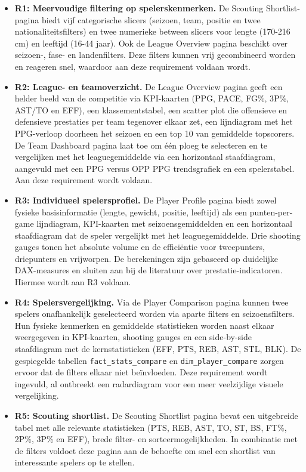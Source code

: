 \begin{itemize}
  \item \textbf{R1: Meervoudige filtering op spelerskenmerken.} De Scouting Shortlist-pagina biedt vijf categorische slicers (seizoen, team, positie en twee nationaliteitsfilters) en twee numerieke between slicers voor lengte (170-216 cm) en leeftijd (16-44 jaar). Ook de League Overview pagina beschikt over seizoen-, fase- en landenfilters. Deze filters kunnen vrij gecombineerd worden en reageren snel, waardoor aan deze requirement voldaan wordt.
 
  \item \textbf{R2: League- en teamoverzicht.} De League Overview pagina geeft een helder beeld van de competitie via KPI-kaarten (PPG, PACE, FG\%, 3P\%, AST/TO en EFF), een klassementstabel, een scatter plot die offensieve en defensieve prestaties per team tegenover elkaar zet, een lijndiagram met het PPG-verloop doorheen het seizoen en een top 10 van gemiddelde topscorers. De Team Dashboard pagina laat toe om één ploeg te selecteren en te vergelijken met het leaguegemiddelde via een horizontaal staafdiagram, aangevuld met een PPG versus OPP PPG trendsgrafiek en een spelerstabel. Aan deze requirement wordt voldaan.
 
  \item \textbf{R3: Individueel spelersprofiel.} De Player Profile pagina biedt zowel fysieke basisinformatie (lengte, gewicht, positie, leeftijd) als een punten-per-game lijndiagram, KPI-kaarten met seizoensgemiddelden en een horizontaal staafdiagram dat de speler vergelijkt met het leaguegemiddelde. Drie shooting gauges tonen het absolute volume en de efficiëntie voor tweepunters, driepunters en vrijworpen. De berekeningen zijn gebaseerd op duidelijke DAX-measures en sluiten aan bij de literatuur over prestatie-indicatoren. Hiermee wordt aan R3 voldaan.
 
  \item \textbf{R4: Spelersvergelijking.} Via de Player Comparison pagina kunnen twee spelers onafhankelijk geselecteerd worden via aparte filters en seizoensfilters. Hun fysieke kenmerken en gemiddelde statistieken worden naast elkaar weergegeven in KPI-kaarten, shooting gauges en een side-by-side staafdiagram met de kernstatistieken (EFF, PTS, REB, AST, STL, BLK). De gespiegelde tabellen \texttt{fact\_stats\_compare} en \texttt{dim\_player\_compare} zorgen ervoor dat de filters elkaar niet beïnvloeden. Deze requirement wordt ingevuld, al ontbreekt een radardiagram voor een meer veelzijdige visuele vergelijking.
 
  \item \textbf{R5: Scouting shortlist.} De Scouting Shortlist pagina bevat een uitgebreide tabel met alle relevante statistieken (PTS, REB, AST, TO, ST, BS, FT\%, 2P\%, 3P\% en EFF), brede filter- en sorteermogelijkheden. In combinatie met de filters voldoet deze pagina aan de behoefte om snel een shortlist van interessante spelers op te stellen.
\end{itemize}

